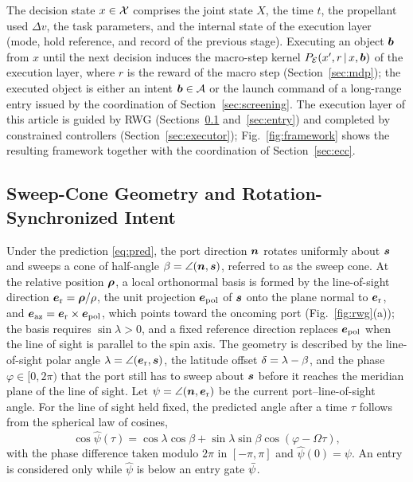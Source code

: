 The decision state $x\in\mathcal{X}$ comprises the joint state $X$, the time $t$, the propellant used $\Delta v$, the task parameters, and the internal state of the execution layer (mode, hold reference, and record of the previous stage). Executing an object $\boldsymbol{b}$ from $x$ until the next decision induces the macro-step kernel $P_{\mathcal{E}}(x',r\,|\,x,\boldsymbol{b})$ of the execution layer, where $r$ is the reward of the macro step (Section~\ref{sec:mdp}); the executed object is either an intent $\boldsymbol{b}\in\mathcal{A}$ or the launch command of a long-range entry issued by the coordination of Section~\ref{sec:screening}. The execution layer of this article is guided by RWG (Sections~\ref{sec:geometry} and~\ref{sec:entry}) and completed by constrained controllers (Section~\ref{sec:executor}); Fig.~\ref{fig:framework} shows the resulting framework together with the coordination of Section~\ref{sec:ecc}.

\subsection{Sweep-Cone Geometry and Rotation-Synchronized Intent}\label{sec:geometry}

Under the prediction \eqref{eq:pred}, the port direction $\boldsymbol{n}$ rotates uniformly about $\boldsymbol{s}$ and sweeps a cone of half-angle $\beta=\angle(\boldsymbol{n},\boldsymbol{s})$, referred to as the sweep cone. At the relative position $\boldsymbol{\rho}$, a local orthonormal basis is formed by the line-of-sight direction $\boldsymbol{e}_{\mathrm{r}}=\boldsymbol{\rho}/\rho$, the unit projection $\boldsymbol{e}_{\mathrm{pol}}$ of $\boldsymbol{s}$ onto the plane normal to $\boldsymbol{e}_{\mathrm{r}}$, and $\boldsymbol{e}_{\mathrm{az}}=\boldsymbol{e}_{\mathrm{r}}\times\boldsymbol{e}_{\mathrm{pol}}$, which points toward the oncoming port (Fig.~\ref{fig:rwg}(a)); the basis requires $\sin\lambda>0$, and a fixed reference direction replaces $\boldsymbol{e}_{\mathrm{pol}}$ when the line of sight is parallel to the spin axis. The geometry is described by the line-of-sight polar angle $\lambda=\angle(\boldsymbol{e}_{\mathrm{r}},\boldsymbol{s})$, the latitude offset $\delta=\lambda-\beta$, and the phase $\varphi\in[0,2\pi)$ that the port still has to sweep about $\boldsymbol{s}$ before it reaches the meridian plane of the line of sight. Let $\psi=\angle(\boldsymbol{n},\boldsymbol{e}_{\mathrm{r}})$ be the current port--line-of-sight angle. For the line of sight held fixed, the predicted angle after a time $\tau$ follows from the spherical law of cosines,
\begin{equation}\label{eq:theta}
\cos\hat\psi(\tau)=\cos\lambda\cos\beta+\sin\lambda\sin\beta\cos(\varphi-\Omega\tau),
\end{equation}
with the phase difference taken modulo $2\pi$ in $[-\pi,\pi]$ and $\hat\psi(0)=\psi$. An entry is considered only while $\hat\psi$ is below an entry gate $\bar\psi$.

